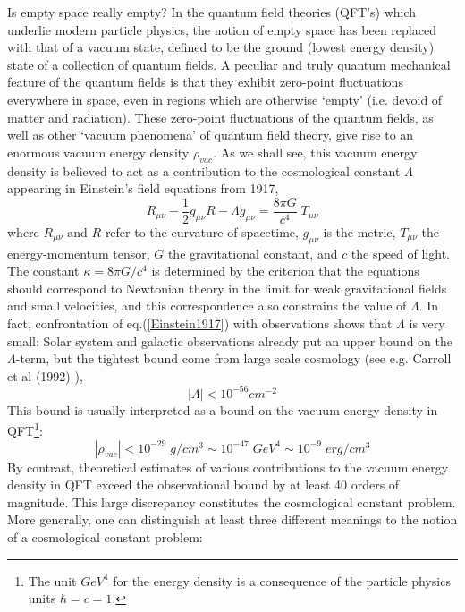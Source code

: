 \documentclass[12pt]{article}
\newcommand{\beq}{\begin{equation}}
\newcommand{\eeq}{\end{equation}}
\begin{document}
Is empty space really empty?  In the quantum field theories (QFT's)
which underlie modern particle physics, the notion of empty space has
been replaced with that of a vacuum state, defined to be the ground
(lowest energy density) state of a collection of quantum fields.  A
peculiar and truly quantum mechanical feature of the quantum fields is
that they exhibit zero-point fluctuations everywhere in space, even in
regions which are otherwise `empty' (i.e. devoid of matter and
radiation). These zero-point fluctuations of the quantum fields, as
well as other `vacuum phenomena' of quantum field theory, give rise to
an enormous vacuum energy density $\rho_{vac}$. As we shall see, this
vacuum energy density is believed to act as a contribution to the
cosmological constant $\Lambda$ appearing in Einstein's field
equations from 1917,
\begin{equation}
\label{Einstein1917} R_{\mu \nu} - \frac{1}{2} g_{\mu \nu} R -
\Lambda g_{\mu \nu} = \frac{8 \pi G}{c^4} \; T_{\mu \nu}
\end{equation}
where $R_{\mu \nu}$ and $R$ refer to the curvature of spacetime,
$g_{\mu \nu}$ is the metric, 
$T_{\mu \nu}$ the energy-momentum 
tensor, $G$ the gravitational constant, and $c$ the speed of light.
The constant $\kappa = 8\pi G/c^4$ is determined by the criterion
that the equations should correspond to Newtonian theory in the limit
for weak gravitational fields and small velocities, and this
correspondence also constrains the value of $\Lambda$.
In fact, confrontation of eq.(\ref{Einstein1917}) with observations 
shows that $\Lambda$ is very small: Solar system and galactic 
observations already put an upper bound on the
$\Lambda$-term, but the tightest bound come from large scale cosmology
(see e.g. Carroll et al (1992) \cite{Carrolletal92}), 
\beq
|\Lambda| < 10^{-56} cm^{-2}
\eeq
This bound is usually interpreted as a bound on the vacuum energy 
density in QFT\footnote{The unit $GeV^4$ for the
energy density is a consequence of the particle physics units
$\hbar=c=1$.}: 
\beq 
| \rho_{vac} | < 10^{-29} \; g/cm^3 \sim 10^{-47} \; GeV^4 \sim 10^{-9}
\; erg/cm^3
\label{obsbound}
\eeq
By contrast, theoretical estimates of various contributions to
the vacuum energy density in QFT exceed the observational bound
by at least 40 orders of magnitude. This large discrepancy
constitutes the cosmological constant problem. More generally, one can
distinguish at least three different meanings to the notion of a
cosmological constant problem:\\ 
\end{document}
